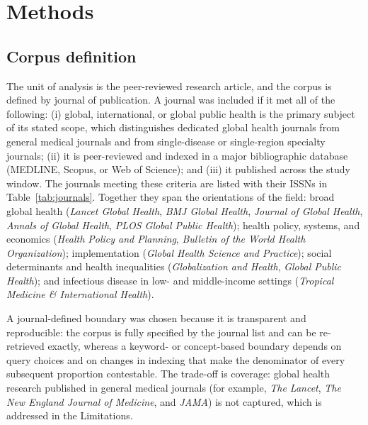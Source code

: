 
\section{Methods}

\subsection{Corpus definition}

The unit of analysis is the peer-reviewed research article, and the corpus is
defined by journal of publication. A journal was included if it met all of the
following: (i) global, international, or global public health is the primary
subject of its stated scope, which distinguishes dedicated global health
journals from general medical journals and from single-disease or
single-region specialty journals; (ii) it is peer-reviewed and indexed in a
major bibliographic database (MEDLINE, Scopus, or Web of Science); and (iii) it
published across the study window. The journals meeting these criteria are
listed with their ISSNs in Table~\ref{tab:journals}. Together they span the
orientations of the field: broad global health (\emph{Lancet Global Health},
\emph{BMJ Global Health}, \emph{Journal of Global Health}, \emph{Annals of
Global Health}, \emph{PLOS Global Public Health}); health policy, systems, and
economics (\emph{Health Policy and Planning}, \emph{Bulletin of the World
Health Organization}); implementation (\emph{Global Health Science and
Practice}); social determinants and health inequalities (\emph{Globalization
and Health}, \emph{Global Public Health}); and infectious disease in low- and
middle-income settings (\emph{Tropical Medicine \& International Health}).

A journal-defined boundary was chosen because it is transparent and
reproducible: the corpus is fully specified by the journal list and can be
re-retrieved exactly, whereas a keyword- or concept-based boundary depends on
query choices and on changes in indexing that make the denominator of every
subsequent proportion contestable. The trade-off is coverage: global health
research published in general medical journals (for example, \emph{The Lancet},
\emph{The New England Journal of Medicine}, and \emph{JAMA}) is not captured,
which is addressed in the Limitations.

